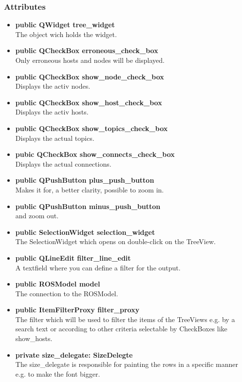 \subsubsection{Attributes}
\begin{itemize}
  \item \textbf{public QWidget tree\_widget}\\
  The object wich holds the widget.
  \item \textbf{public QCheckBox erroneous\_check\_box}\\
  Only erroneous hosts and nodes will be displayed.
  \item \textbf{public QCheckBox show\_node\_check\_box}\\
  Displays the activ nodes.
  \item \textbf{public QCheckBox show\_host\_check\_box}\\
  Displays the activ hosts.
  \item \textbf{public QCheckBox show\_topics\_check\_box}\\
  Displays the actual topics.
  \item \textbf{pubic QCheckBox show\_connects\_check\_box}\\
  Displays the actual connections.
  \item \textbf{public QPushButton plus\_push\_button}\\
  Makes it for, a better clarity, possible to zoom in.
  \item \textbf{public QPushButton minus\_push\_button}\\
  and zoom out.
  \item \textbf{public SelectionWidget selection\_widget}\\
  The SelectionWidget which opens on double-click on the TreeView.
  \item \textbf{public QLineEdit filter\_line\_edit}\\
  A textfield where you can define a filter for the output.
  \item \textbf{public ROSModel model}\\
  The connection to the ROSModel.
  \item \textbf{public ItemFilterProxy filter\_proxy}\\
  The filter which will be used to filter the items of the TreeViews e.g. by a search text or according to other criteria selectable by CheckBoxes like show\_hosts.
  \item \textbf{private size\_delegate: SizeDelegte}\\
  The size\_delegate is responsible for painting the rows in a specific manner e.g. to make the font bigger.
  
\end{itemize}
